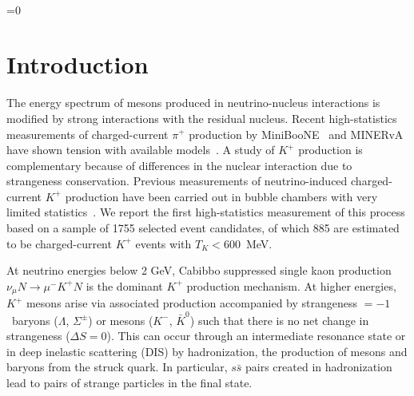 \documentclass[aps,prl,preprint,showpacs,superscriptaddress,nofootinbib,floatfix,linenumbers]{revtex4}
\newcommand{\minerva}{MINERvA\xspace}
\newcommand{\genie}{\textsc{genie}\xspace}
\newcommand{\dxs}{\ensuremath{d\sigma/dT_{K}}}
\newcommand{\numu}{\ensuremath{\nu_{\mu}}\xspace}
\newcommand{\pip}{\ensuremath{\pi^{+}}\xspace}
\newcommand{\kp}{\ensuremath{K^{+}}\xspace}
\newcommand{\km}{\ensuremath{K^{-}}\xspace}
\newcommand{\mum}{\ensuremath{\mu^{-}}\xspace}
\newcommand{\sizecheck}{0} %
\begin{document}
\collaboration{ \minerva  Collaboration}\ \noaffiliation

\date{\today}

\begin{abstract}

Production of \kp mesons in charged-current \numu interactions on plastic scintillator (CH) is measured using \minerva exposed to the low-energy NuMI beam at Fermilab. Timing information is used to isolate a sample of 885 charged-current events containing a stopping \kp which decays at rest. The differential cross section in \kp kinetic energy, \dxs, is observed to be relatively flat between 0 and 500 MeV. Its shape is in good agreement with the prediction by the \genie neutrino event generator when final-state interactions are included, however the data rate is lower than the prediction by 15\%.

\end{abstract}
\ifnum\sizecheck=0  
\maketitle
\fi

\section{Introduction}
\label{sec:intro}

The energy spectrum of mesons produced in neutrino-nucleus interactions is modified by strong interactions with the residual nucleus. Recent high-statistics measurements of charged-current \pip production by MiniBooNE~\cite{miniboone_pion} and MINERvA~\cite{minerva_pion} have shown tension with available models~\cite{jan_pion}. A study of \kp production is complementary because of differences in the nuclear interaction due to strangeness conservation. Previous measurements of neutrino-induced charged-current \kp production have been carried out in bubble chambers with very limited statistics~\cite{anl2, anl12ft, bnl7ft, gargamelle}. We report the first high-statistics measurement of this process based on a sample of 1755 selected event candidates, of which 885 are estimated to be charged-current \kp events with $T_{K} < 600$~MeV.

At neutrino energies below 2 GeV, Cabibbo suppressed single kaon production $\nu_{\mu} N \rightarrow \mum \kp N$ is the dominant \kp production mechanism. At higher energies, \kp mesons arise via associated production accompanied by strangeness $= -1$~baryons ($\Lambda$, $\Sigma^{\pm}$) or mesons (\km, $\bar{K}^{0}$) such that there is no net change in strangeness ($\Delta S = 0$). This can occur through an intermediate resonance state or in deep inelastic scattering (DIS) by hadronization, the production of mesons and baryons from the struck quark. In particular, $s\bar{s}$ pairs created in hadronization lead to pairs of strange particles in the final state. 
\end{document}
